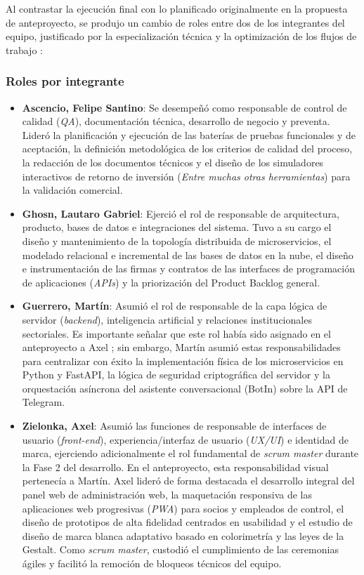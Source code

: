 Al contrastar la ejecución final con lo planificado originalmente en la propuesta de anteproyecto, se produjo un cambio de roles entre dos de los integrantes del equipo, justificado por la especialización técnica y la optimización de los flujos de trabajo :

\subsubsection{Roles por integrante}

\begin{itemize}
    \item \textbf{Ascencio, Felipe Santino}: Se desempeñó como responsable de control de calidad (\textit{QA}), documentación técnica, desarrollo de negocio y preventa. Lideró la planificación y ejecución de las baterías de pruebas funcionales y de aceptación, la definición metodológica de los criterios de calidad del proceso, la redacción de los documentos técnicos y el diseño de los simuladores interactivos de retorno de inversión (\textit{Entre muchas otras herramientas}) para la validación comercial. 
    \item \textbf{Ghosn, Lautaro Gabriel}: Ejerció el rol de responsable de arquitectura, producto, bases de datos e integraciones del sistema. Tuvo a su cargo el diseño y mantenimiento de la topología distribuida de microservicios, el modelado relacional e incremental de las bases de datos en la nube, el diseño e instrumentación de las firmas y contratos de las interfaces de programación de aplicaciones (\textit{APIs}) y la priorización del Product Backlog general.
    \item \textbf{Guerrero, Martín}: Asumió el rol de responsable de la capa lógica de servidor (\textit{backend}), inteligencia artificial y relaciones institucionales sectoriales. Es importante señalar que este rol había sido asignado en el anteproyecto a Axel ; sin embargo, Martín asumió estas responsabilidades para centralizar con éxito la implementación física de los microservicios en Python y FastAPI, la lógica de seguridad criptográfica del servidor y la orquestación asíncrona del asistente conversacional (BotIn) sobre la API de Telegram.
    \item \textbf{Zielonka, Axel}: Asumió las funciones de responsable de interfaces de usuario (\textit{front-end}), experiencia/interfaz de usuario (\textit{UX/UI}) e identidad de marca, ejerciendo adicionalmente el rol fundamental de \textit{scrum master} durante la Fase 2 del desarrollo. En el anteproyecto, esta responsabilidad visual pertenecía a Martín. Axel lideró de forma destacada el desarrollo integral del panel web de administración web, la maquetación responsiva de las aplicaciones web progresivas (\textit{PWA}) para socios y empleados de control, el diseño de prototipos de alta fidelidad centrados en usabilidad y el estudio de diseño de marca blanca adaptativo basado en colorimetría y las leyes de la Gestalt. Como \textit{scrum master}, custodió el cumplimiento de las ceremonias ágiles y facilitó la remoción de bloqueos técnicos del equipo.
\end{itemize}


